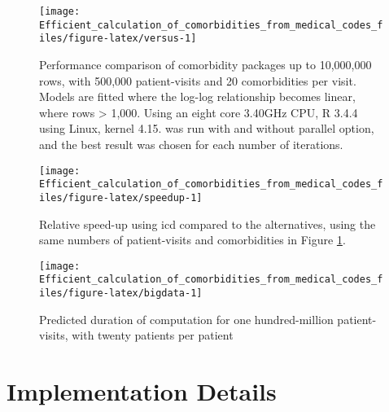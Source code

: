 \documentclass[article]{jss}
\begin{document}
\begin{CodeChunk}
\begin{figure}

{\centering \texttt{[image: Efficient\_calculation\_of\_comorbidities\_from\_medical\_codes\_files/figure-latex/versus-1]} 

}

\caption[Performance comparison of comorbidity packages up to 10,000,000 rows, with 500,000 patient-visits and 20 comorbidities per visit]{Performance comparison of comorbidity packages up to 10,000,000 rows, with 500,000 patient-visits and 20 comorbidities per visit. Models are fitted where the log-log relationship becomes linear, where rows > 1,000. Using an eight core 3.40GHz CPU, R 3.4.4 using Linux, kernel 4.15.  was run with and without parallel option, and the best result was chosen for each number of iterations.}\label{fig:versus}
\end{figure}
\end{CodeChunk}\begin{CodeChunk}
\begin{figure}

{\centering \texttt{[image: Efficient\_calculation\_of\_comorbidities\_from\_medical\_codes\_files/figure-latex/speedup-1]} 

}

\caption{Relative speed-up using icd compared to the alternatives, using the same numbers of patient-visits and comorbidities in Figure \ref{fig:versus}.}\label{fig:speedup}
\end{figure}
\end{CodeChunk}\begin{CodeChunk}
\begin{figure}

{\centering \texttt{[image: Efficient\_calculation\_of\_comorbidities\_from\_medical\_codes\_files/figure-latex/bigdata-1]} 

}

\caption[Predicted duration of computation for one hundred-million patient-visits, with twenty patients per patient]{Predicted duration of computation for one hundred-million patient-visits, with twenty patients per patient}\label{fig:bigdata}
\end{figure}
\end{CodeChunk}

\section{Implementation Details}\label{implementation-details}
\end{document}

